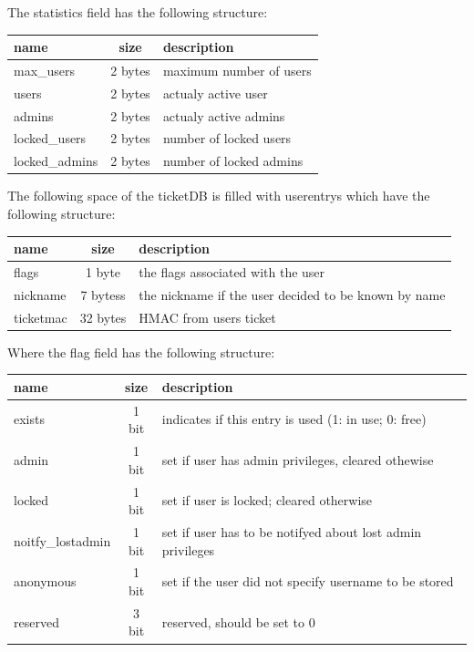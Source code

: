 The statistics field has the following structure:\\
\begin{tabular}{|l|c|l|} \hline
name & size & description \\ \hline 
max\_users     & 2 bytes & maximum number of users \\
users              & 2 bytes & actualy active user \\
admins           & 2 bytes & actualy active admins \\
locked\_users   & 2 bytes & number of locked users \\
locked\_admins & 2 bytes & number of locked admins \\ \hline
\end{tabular} 

The following space of the ticketDB is filled with userentrys which have the following structure:\\
\begin{tabular}{|l|c|l|} \hline
name & size & description \\ \hline 
flags         & 1 byte    & the flags associated with the user \\
nickname  & 7 bytess & the nickname if the user decided to be known by name \\
ticketmac  & 32 bytes & HMAC from users ticket \\ \hline
\end{tabular} 

Where the flag field has the following structure: \\
\begin{tabular}{|l|c|l|} \hline
name & size & description \\ \hline 
exists         & 1 bit    &  indicates if this entry is used (1: in use; 0: free)\\
admin  & 1 bit & set if user has admin privileges, cleared othewise \\
locked  & 1 bit & set if user is locked; cleared otherwise \\
noitfy\_lostadmin  & 1 bit & set if user has to be notifyed about lost admin privileges \\
anonymous  & 1 bit & set if the user did not specify username to be stored \\
reserved & 3 bit & reserved, should be set to 0\\ \hline
\end{tabular} 


